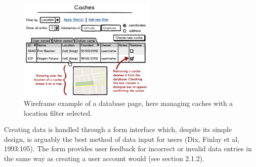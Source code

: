 \begin{figure}[h!]
	\begin{center}
	\includegraphics[width=0.6\textwidth]{images/caches_wireframe}
	\caption{Wireframe example of a database page, here managing caches with a location filter selected.}
	\label{caches_wireframe}
	\end{center}
\end{figure}

Creating data is handled through a form interface which, despite its simple design, is arguably the best method of data input for users (Dix, Finlay et al, 1993:105). The form provides user feedback for incorrect or invalid data entries in the same way as creating a user account would (see section 2.1.2).
